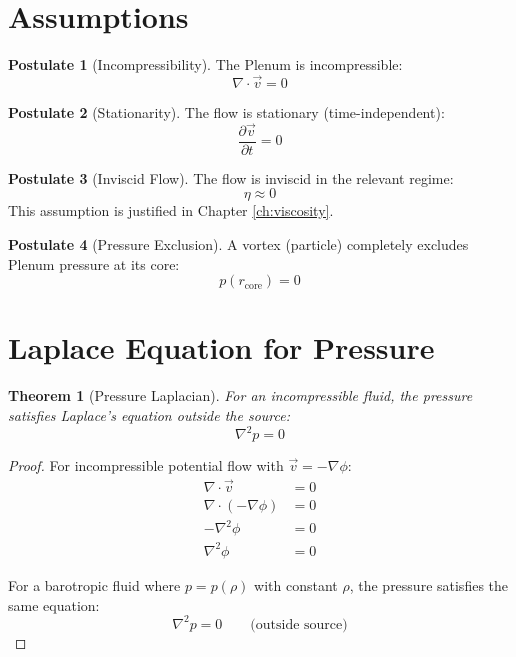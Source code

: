 \documentclass[12pt,a4paper,openany]{book}
\theoremstyle{definition}
\newtheorem{postulate}{Postulate}[chapter]
\theoremstyle{plain}
\newtheorem{theorem}{Theorem}[chapter]
\theoremstyle{remark}
\newcommand{\rcore}{r_{\text{core}}}       %
\begin{document}
\section{Assumptions}

\begin{postulate}[Incompressibility]
\label{post:incomp}
The Plenum is incompressible:
\begin{equation}
\nabla \cdot \vec{v} = 0
\label{eq:incomp}
\end{equation}
\end{postulate}

\begin{postulate}[Stationarity]
\label{post:station}
The flow is stationary (time-independent):
\begin{equation}
\frac{\partial \vec{v}}{\partial t} = 0
\label{eq:station}
\end{equation}
\end{postulate}

\begin{postulate}[Inviscid Flow]
\label{post:inviscid}
The flow is inviscid in the relevant regime:
\begin{equation}
\eta \approx 0
\label{eq:inviscid}
\end{equation}
This assumption is justified in Chapter \ref{ch:viscosity}.
\end{postulate}

\begin{postulate}[Pressure Exclusion]
\label{post:exclusion}
A vortex (particle) completely excludes Plenum pressure at its core:
\begin{equation}
p(\rcore) = 0
\label{eq:exclusion}
\end{equation}
\end{postulate}

\section{Laplace Equation for Pressure}

\begin{theorem}[Pressure Laplacian]
For an incompressible fluid, the pressure satisfies Laplace's equation outside the source:
\begin{equation}
\nabla^2 p = 0
\label{eq:laplace}
\end{equation}
\end{theorem}

\begin{proof}
For incompressible potential flow with $\vec{v} = -\nabla\phi$:
\begin{align}
\nabla \cdot \vec{v} &= 0 \\
\nabla \cdot (-\nabla\phi) &= 0 \\
-\nabla^2 \phi &= 0 \\
\nabla^2 \phi &= 0
\end{align}

For a barotropic fluid where $p = p(\rho)$ with constant $\rho$, the pressure satisfies the same equation:
\begin{equation}
\nabla^2 p = 0 \qquad \text{(outside source)}
\end{equation}
\end{proof}
\end{document}
